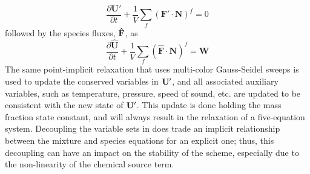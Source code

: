 \begin{equation}
  \frac{\partial \mathbf{{U}'}}{\partial t} +
  \frac{1}{V}\sum\limits_{f}(\mathbf{F}'\cdot\mathbf{N})^f = 0
\end{equation}
followed by the species fluxes, $\mathbf{\hat{F}}$, as
\begin{equation}
  \frac{\partial \mathbf{\hat{U}}}{\partial t} +
  \frac{1}{V}\sum\limits_{f}(\mathbf{\hat{F}}\cdot\mathbf{N})^f =
  \mathbf{\hat{W}}
\end{equation}
The same point-implicit relaxation that uses multi-color Gauss-Seidel sweeps is
used to update the conserved variables in $\mathbf U '$, and all associated
auxiliary variables, such as temperature, pressure, speed of sound, etc. are
updated to be consistent with the new state of $\mathbf U '$.  This update is done
holding the mass fraction state constant, and will always result in the
relaxation of a five-equation system.  Decoupling the variable sets in
 does trade an implicit relationship between the mixture and
species equations for an explicit one; thus, this decoupling can have an impact
on the stability of the scheme, especially due to the non-linearity of the
chemical source term\cite{park}.
 
